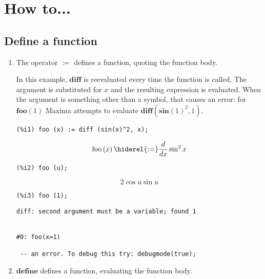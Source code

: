 \documentclass[12pt,leqno]{article}
\begin{document}
\section{How to...}

\subsection{Define a function}

\begin{enumerate}

\item The operator $\mathbf{:=}$ defines a function, quoting the function body.

In this example, $\mathbf{diff}$ is reevaluated every time the function is called.
The argument is substituted for $x$ and the resulting expression is evaluated.
When the argument is something other than a symbol, that causes an error:
for $\mathbf{foo} (1)$ Maxima attempts to evaluate $\mathbf{diff} (\mathbf{sin}(1)^2, 1)$.
\begin{verbatim}
(%i1) foo (x) := diff (sin(x)^2, x);
\end{verbatim}
\begin{dmath}[number={\(\mathop{\mathrm{\%o}_{1}}\)}]
\mathop{\mathrm{foo}}\left(x\right) \hiderel{:=} \frac{d}{\mathop{dx}}\sin^{2} x
\end{dmath}
\begin{verbatim}
(%i2) foo (u);
\end{verbatim}
\begin{dmath}[number={\(\mathop{\mathrm{\%o}_{2}}\)}]
2 \cos u \sin u
\end{dmath}
\begin{verbatim}
(%i3) foo (1);
\end{verbatim}
\begin{Verbatim}
diff: second argument must be a variable; found 1


#0: foo(x=1)

 -- an error. To debug this try: debugmode(true);
\end{Verbatim}


\item $\mathbf{define}$ defines a function, evaluating the function body.


\end{enumerate}
\end{document}
